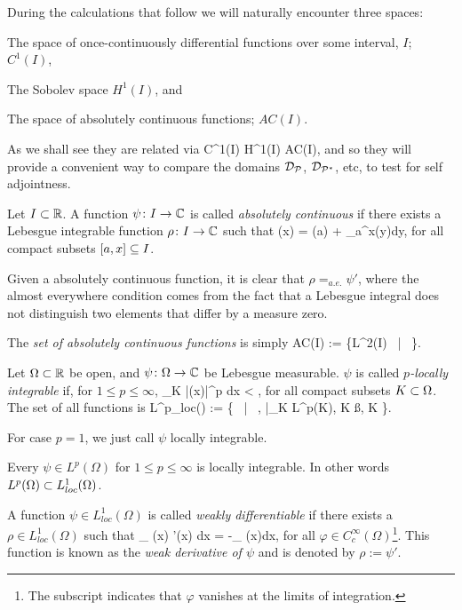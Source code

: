 During the calculations that follow we will naturally encounter three spaces: 

\ben[label=(\roman*)]
\item The space of once-continuously differential functions over some interval, $I$; $C^1(I)$, 
\item The Sobolev space $H^1(I)$, and 
\item The space of absolutely continuous functions; $AC(I)$.
\een

As we shall see they are related via 
\bse 
 C^1(I) \se H^1(I) \se AC(I),
\ese
and so they will provide a convenient way to compare the domains $\cD_{\cP}$, $\cD_{\cP^*}$, etc, to test for self adjointness.

\bd
Let $I \ss \R$. A function $\psi\cl I \to \C$ is called \emph{absolutely continuous} if there exists a Lebesgue integrable function $\rho\cl I \to \C$ such that 
\bse
\psi(x) = \psi(a) + \int_a^x\rho(y)dy,
\ese
for all compact subsets $[a,x]\se I$.
\ed

\bc 
Given a absolutely continuous function, it is clear that $\rho =_{a.e.} \psi'$, where the almost everywhere condition comes from the fact that a Lebesgue integral does not distinguish two elements that differ by a measure zero.
\ec

\bd
The \emph{set of absolutely continuous functions} is simply 
\bse 
AC(I) := \{\psi\in L^2(I) \, | \, \psi {}\}.
\ese 
\ed

\bd 
Let $\Omega \ss \R$ be open, and $\psi\cl \Omega\to \C$ be Lebesgue measurable. $\psi$ is called \emph{$p$-locally integrable} if, for $1\leq p \leq \infty$,
\bse 
\int_K |\psi(x)|^p dx < \infty,
\ese 
for all compact subsets $K\ss \Omega$. The set of all functions is
\bse 
L^p_{loc}(\Omega) := \{ \psi \cl \Omega \to \C \, | \, \psi {}, \psi|_K \in L^p(K), \forall K \ss \Omega, K \}.
\ese 
\ed 

\br 
For case $p=1$, we just call $\psi$ locally integrable.
\er 

\bt 
Every $\psi\in L^p(\Omega)$ for $1\leq p \leq \infty$ is locally integrable. In other words $L^p(\Omega) \ss L^1_{loc}(\Omega)$.
\et 

\bd
A function $\psi \in L^1_{loc}(\Omega)$ is called \emph{weakly differentiable} if there exists a $\rho\in L^1_{loc}(\Omega)$ such that 
\bse 
\int_{\Omega} \psi(x) \varphi'(x) dx = -\int_{\Omega} \rho(x)\varphi dx,
\ese 
for all $\varphi \in C^{\infty}_c(\Omega)$\footnote{The subscript indicates that $\varphi$ vanishes at the limits of integration.}. This function is known as the \emph{weak derivative of $\psi$} and is denoted by $\rho := \psi'$.
\ed 

